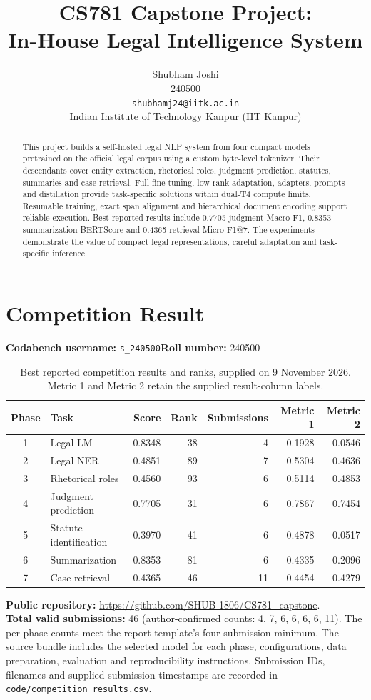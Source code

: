 \documentclass[11pt, oneside]{article}
\title{CS781 Capstone Project:\\
In-House Legal Intelligence System}
\author{
    Shubham Joshi \\
    240500 \\
    {\tt shubhamj24@iitk.ac.in}\\
    Indian Institute of Technology Kanpur (IIT Kanpur)
}
\date{}
\begin{document}
\maketitle

\begin{abstract}
This project builds a self-hosted legal NLP system from four compact models pretrained
on the official legal corpus using a custom byte-level tokenizer. Their descendants
cover entity extraction, rhetorical roles, judgment prediction, statutes, summaries
and case retrieval. Full fine-tuning, low-rank adaptation, adapters, prompts and
distillation provide task-specific solutions within dual-T4 compute limits.
Resumable training, exact span alignment and hierarchical document encoding support
reliable execution. Best reported results include 0.7705 judgment Macro-F1,
0.8353 summarization BERTScore and 0.4365 retrieval Micro-F1@7. The experiments
demonstrate the value of compact legal representations, careful adaptation and
task-specific inference.
\end{abstract}

\section{Competition Result}
\noindent\textbf{Codabench username:} \texttt{s\_240500}\hfill\textbf{Roll number:} 240500
\begin{table}[H]\centering\small
\caption{Best reported competition results and ranks, supplied on 9 November 2026.
Metric 1 and Metric 2 retain the supplied result-column labels.}
\label{tab:leaderboard}
\setlength{\tabcolsep}{4pt}
\begin{tabular}{clrrrrr}\toprule
Phase & Task & Score & Rank & Submissions & Metric 1 & Metric 2\\\midrule
1 & Legal LM & 0.8348 & 38 & 4 & 0.1928 & 0.0546 \\
2 & Legal NER & 0.4851 & 89 & 7 & 0.5304 & 0.4636 \\
3 & Rhetorical roles & 0.4560 & 93 & 6 & 0.5114 & 0.4853 \\
4 & Judgment prediction & 0.7705 & 31 & 6 & 0.7867 & 0.7454 \\
5 & Statute identification & 0.3970 & 41 & 6 & 0.4878 & 0.0517 \\
6 & Summarization & 0.8353 & 81 & 6 & 0.4335 & 0.2096 \\
7 & Case retrieval & 0.4365 & 46 & 11 & 0.4454 & 0.4279 \\
\bottomrule\end{tabular}\end{table}
\noindent\textbf{Public repository:} \url{https://github.com/SHUB-1806/CS781_capstone}.\\
\textbf{Total valid submissions:} 46 (author-confirmed counts: 4, 7, 6, 6, 6, 6, 11).
The per-phase counts meet the report template's four-submission minimum. The source
bundle includes the selected model for each phase, configurations, data preparation,
evaluation and reproducibility instructions. Submission IDs, filenames and supplied
submission timestamps are recorded in \texttt{code/competition\_results.csv}.
\end{document}
